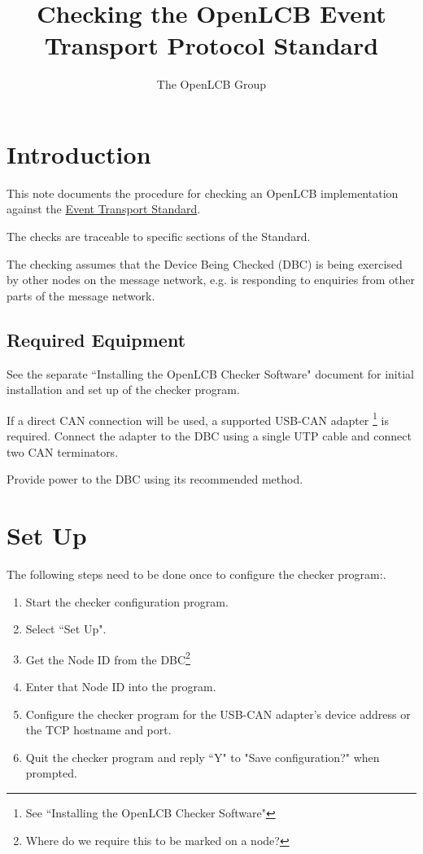 \documentclass[11pt]{article}
\title{Checking the OpenLCB Event Transport Protocol Standard}
\author{The OpenLCB Group}
\begin{document}
\maketitle


\section{Introduction}

This note documents the procedure for checking an OpenLCB implementation against the 
\href{https://nbviewer.org/github/openlcb/documents/blob/master/standards/EventTransportS.pdf}{Event Transport Standard}.

The checks are traceable to specific sections of the Standard.

The checking assumes that the Device Being Checked (DBC) is being exercised by other
nodes on the message network, 
e.g. is responding to enquiries from other parts of the message network.

\subsection{Required Equipment}

See the separate ``Installing the OpenLCB Checker Software" document for initial installation 
and set up of the checker program.

If a direct CAN connection will be used,
a supported USB-CAN adapter
    \footnote{See ``Installing the OpenLCB Checker Software"}
is required. 
Connect the adapter to the DBC using a single UTP cable and connect two CAN terminators.

Provide power to the DBC using its recommended method.

\section{Set Up}
The following steps need to be done once to configure the checker program:.
\begin{enumerate}
\item Start the checker configuration program. 
\item Select ``Set Up".
\item Get the Node ID from the DBC\footnote{Where do we require this to be marked on a node?} 
\item Enter that Node ID into the program.
\item Configure the checker program for the USB-CAN adapter's device address
        or the TCP hostname and port.
\item Quit the checker program and reply ``Y" to "Save configuration?" when prompted.
\end{enumerate}
\end{document}
